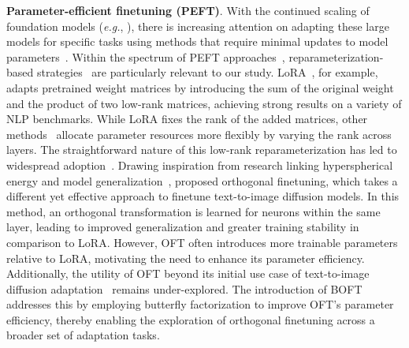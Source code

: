 \textbf{Parameter-efficient finetuning (PEFT)}. With the continued scaling of foundation models (\emph{e.g.}, \cite{brown2020language,radford2021learning,rombach2022high,kirillov2023segment}), there is increasing attention on adapting these large models for specific tasks using methods that require minimal updates to model parameters~\cite{treviso2023efficient,ding2023parameter,lialin2023scaling}. Within the spectrum of PEFT approaches~\cite{houlsby2019parameter,aghajanyan2020intrinsic,hulora2022,edalati2022krona,wang2022adamix,gheini2021cross,zaken2022bitfit,guo2020parameter,sung2021training,ansell2022composable,lester2021power,li2021prefix,vu2022spot,he2021towards,mao2021unipelt,karimi2021compacter,liu2022few,sung2022lst,chen2022parameter,jia2022visual,chen2022adaptformer,zhang2022neural,jie2023fact,lian2022scaling,luo2023towards}, reparameterization-based strategies~\cite{aghajanyan2020intrinsic,hulora2022,edalati2022krona} are particularly relevant to our study. LoRA~\cite{hulora2022}, for example, adapts pretrained weight matrices by introducing the sum of the original weight and the product of two low-rank matrices, achieving strong results on a variety of NLP benchmarks. While LoRA fixes the rank of the added matrices, other methods~\cite{zhang2022adaptive,valipour2022dylora,zhang2023increlora} allocate parameter resources more flexibly by varying the rank across layers. The straightforward nature of this low-rank reparameterization has led to widespread adoption~\cite{dettmers2023qlora,zi2023delta,chavan2023one}. Drawing inspiration from research linking hyperspherical energy and model generalization~\cite{liu2018learning,liu2021orthogonal}, \cite{qiu2023controlling} proposed orthogonal finetuning, which takes a different yet effective approach to finetune text-to-image diffusion models. In this method, an orthogonal transformation is learned for neurons within the same layer, leading to improved generalization and greater training stability in comparison to LoRA. However, OFT often introduces more trainable parameters relative to LoRA, motivating the need to enhance its parameter efficiency. Additionally, the utility of OFT beyond its initial use case of text-to-image diffusion adaptation~\cite{qiu2023controlling} remains under-explored. The introduction of BOFT addresses this by employing butterfly factorization to improve OFT's parameter efficiency, thereby enabling the exploration of orthogonal finetuning across a broader set of adaptation tasks.

